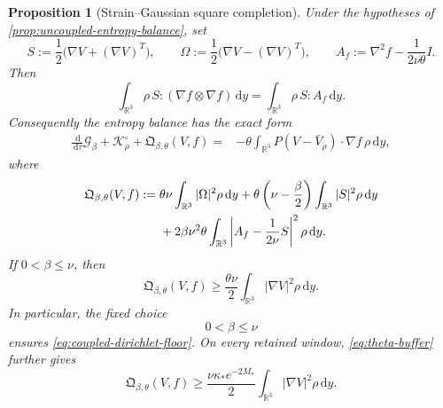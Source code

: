 \documentclass[11pt]{amsart}
\numberwithin{equation}{section}
\theoremstyle{plain}
\newtheorem{proposition}[proposition]{Proposition}
\theoremstyle{definition}
\theoremstyle{remark}
\newcommand{\R}{\mathbb R}
\newcommand{\dd}{\,\mathrm d}
\begin{document}
\begin{proposition}[Strain--Gaussian square completion]
\label{prop:strain-gaussian-completion}
Under the hypotheses of \cref{prop:uncoupled-entropy-balance}, set
\[
 S:=\frac12\bigl(\nabla V+(\nabla V)^T\bigr),
 \qquad
 \Omega:=\frac12\bigl(\nabla V-(\nabla V)^T\bigr),
 \qquad
 A_f:=\nabla^2f-\frac{1}{2\nu\theta}I.
\]
Then
\begin{equation}\label{eq:strain-hessian-transmutation}
 \int_{\R^3}\rho\,S:(\nabla f\otimes\nabla f)\dd y
 =\int_{\R^3}\rho\,S:A_f\dd y.
\end{equation}
Consequently the entropy balance has the exact form
\begin{align}
 \frac{\dd}{\dd\tau}\mathcal G_\beta
 +\mathcal K_\rho^\circ
 +\mathfrak Q_{\beta,\theta}(V,f)
 ={}&-\theta\int_{\R^3}
 P(V-\bar V_\rho)\cdot\nabla f\,\rho\dd y,
 \label{eq:completed-entropy-balance}
\end{align}
where
\begin{align}
 \mathfrak Q_{\beta,\theta}(V,f)
 :={}&\theta\nu\int_{\R^3}|\Omega|^2\rho\dd y
 +\theta\left(\nu-\frac{\beta}{2}\right)
   \int_{\R^3}|S|^2\rho\dd y
\notag\\
&+2\beta\nu^2\theta\int_{\R^3}
 \left|A_f-\frac{1}{2\nu}S\right|^2\rho\dd y.
 \label{eq:coupled-coercive-form}
\end{align}
If \(0<\beta\le\nu\), then
\begin{equation}\label{eq:coupled-dirichlet-floor}
 \mathfrak Q_{\beta,\theta}(V,f)
 \ge \frac{\theta\nu}{2}\int_{\R^3}|\nabla V|^2\rho\dd y.
\end{equation}
In particular, the fixed choice
\begin{equation}\label{eq:beta-smallness}
 0<\beta\le\nu
\end{equation}
ensures \eqref{eq:coupled-dirichlet-floor}.  On every retained window,
\eqref{eq:theta-buffer} further gives
\begin{equation}\label{eq:coupled-unweighted-dirichlet-floor}
 \mathfrak Q_{\beta,\theta}(V,f)
 \ge \frac{\nu\kappa_*e^{-2M_*}}{2}
       \int_{\R^3}|\nabla V|^2\rho\dd y.
\end{equation}
\end{proposition}
\end{document}
